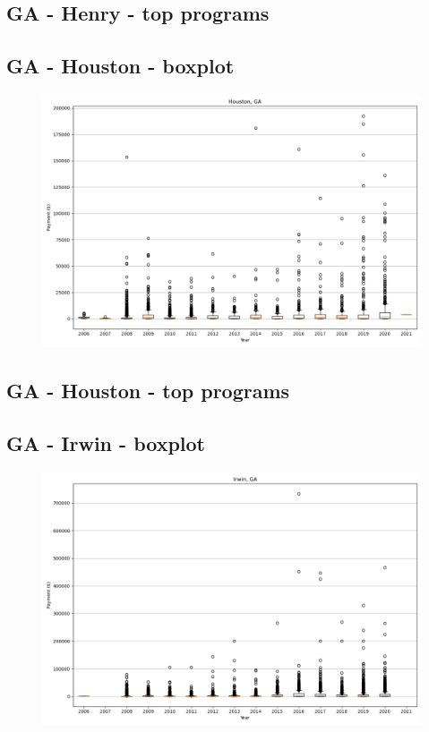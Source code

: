 \subsection*{GA - Henry - top programs}

\newpage
\subsection*{GA - Houston - boxplot}
\begin{figure}[h]
\centering
\includegraphics[width=7in]{../output/boxplots/counties/Houston-GA_boxplot.png}
\end{figure}


\subsection*{GA - Houston - top programs}

\newpage
\subsection*{GA - Irwin - boxplot}
\begin{figure}[h]
\centering
\includegraphics[width=7in]{../output/boxplots/counties/Irwin-GA_boxplot.png}
\end{figure}


